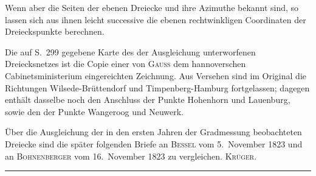 \par\noindent\hspace*{\parindent}Wenn aber die Seiten der ebenen Dreiecke und ihre Azimuthe bekannt sind,
so lassen sich aus ihnen leicht successive die ebenen rechtwinkligen Coordinaten
der Dreieckspunkte berechnen.

\par\noindent\hspace*{\parindent}Die auf S.~299 gegebene Karte des der Ausgleichung unterworfenen Dreiecksnetzes
ist die Copie einer von \textsc{Gauss} dem hannoverschen Cabinetsministerium
eingereichten Zeichnung. Aus Versehen sind im Original die Richtungen
Wilsede-Brüttendorf und Timpenberg-Hamburg fortgelassen; dagegen enthält dasselbe
noch den Anschluss der Punkte Hohenhorn und Lauenburg, sowie den der Punkte Wangeroog und Neuwerk.

\par\noindent\hspace*{\parindent}Über die Ausgleichung der in den ersten Jahren der Gradmessung beobachteten
Dreiecke sind die später folgenden Briefe an \textsc{Bessel} vom 5.~November 1823
und an \textsc{Bohnenberger} vom 16.~November 1823 zu vergleichen.
\hfill\textsc{Krüger.}

\begin{center}\rule{.24\textwidth}{.4pt}\end{center}

